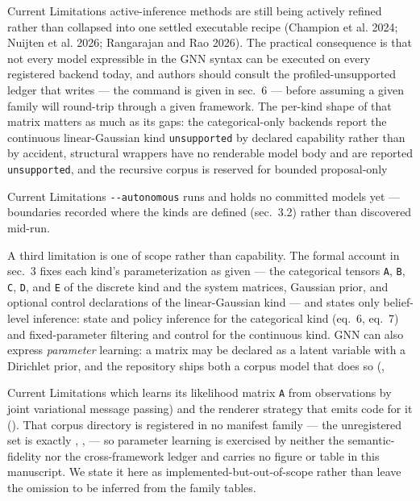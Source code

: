 \documentclass[
  ignorenonframetext,
]{beamer}
\begin{document}
\begin{frame}{Current Limitations}
active-inference methods are still being actively refined rather than
collapsed into one settled executable recipe (Champion et al. 2024;
Nuijten et al. 2026; Rangarajan and Rao 2026). The practical consequence
is that not every model expressible in the GNN syntax can be executed on
every registered backend today, and authors should consult the
profiled-unsupported ledger that
 writes --- the
command is given in sec.~6 --- before assuming a
given family will round-trip through a given framework. The per-kind
shape of that matrix matters as much as its gaps: the categorical-only
backends report the continuous linear-Gaussian kind \texttt{unsupported}
by declared capability rather than by accident, structural wrappers have
no renderable model body and are reported \texttt{unsupported}, and the
recursive corpus is reserved for bounded proposal-only
\end{frame}

\begin{frame}{Current Limitations}
\texttt{-\/-autonomous} runs and holds no committed models yet ---
boundaries recorded where the kinds are defined
(sec.~3.2) rather than discovered mid-run.

A third limitation is one of scope rather than capability. The formal
account in sec.~3 fixes each kind's
parameterization as given --- the categorical tensors \texttt{A},
\texttt{B}, \texttt{C}, \texttt{D}, and \texttt{E} of the discrete kind
and the system matrices, Gaussian prior, and optional control
declarations of the linear-Gaussian kind --- and states only
belief-level inference: state and policy inference for the categorical
kind (eq.~6, eq.~7) and fixed-parameter filtering
and control for the continuous kind. GNN can also express
\emph{parameter} learning: a matrix may be declared as a latent variable
with a Dirichlet prior, and the repository ships both a corpus model
that does so
(,
\end{frame}

\begin{frame}{Current Limitations}
which learns its likelihood matrix \texttt{A} from observations by joint
variational message passing) and the renderer strategy that emits code
for it (). That
corpus directory is registered in no manifest family --- the
unregistered set is exactly ,
,  ---
so parameter learning is exercised by neither the semantic-fidelity nor
the cross-framework ledger and carries no figure or table in this
manuscript. We state it here as implemented-but-out-of-scope rather than
leave the omission to be inferred from the family tables.

\end{frame}
\end{document}

